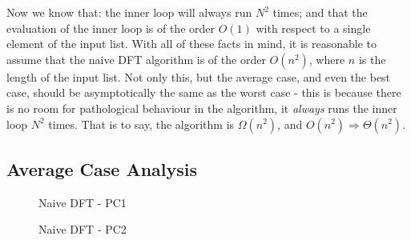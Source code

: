 \documentclass[]{article}
\begin{document}
Now we know that: the inner loop will always run $N^2$ times; and that the evaluation of the inner loop is of the order $O(1)$ with respect to a single element of the input list. With all of these facts in mind, it is reasonable to assume that the naive DFT algorithm is of the order $O(n^2)$, where $n$ is the length of the input list. Not only this, but the average case, and even the best case, should be asymptotically the same as the worst case - this is because there is no room for pathological behaviour in the algorithm, it \emph{always} runs the inner loop $N^2$ times. That is to say, the algorithm is $\Omega(n^2)$, and $O(n^2) \Rightarrow \Theta(n^2)$.

\subsection{Average Case Analysis}\label{sec:dft-average}

\begin{figure}[!htbp]
	\centering
	\begin{minipage}[b]{0.4\textwidth}
		\caption{Naive DFT - PC1\label{fig:compar1}}
	\end{minipage}
	\hfill
	\begin{minipage}[b]{0.4\textwidth}
		\caption{Naive DFT - PC2\label{fig:compar2}}
	\end{minipage}
\end{figure}
\end{document}

